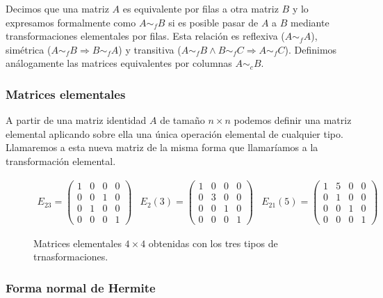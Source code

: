 Decimos que una matriz $A$ es equivalente por filas a otra matriz $B$ y lo expresamos formalmente como $A \sim_f B$ si es posible pasar de $A$ a $B$ mediante transformaciones elementales por filas.
Esta relación es reflexiva ($A \sim_f A$), simétrica ($A \sim_f B \Rightarrow B \sim_f A$) y transitiva ($A \sim_f B \land B \sim_f C \Rightarrow A \sim_f C$).
Definimos análogamente las matrices equivalentes por columnas $A \sim_c B$.

\subsubsection{Matrices elementales}

A partir de una matriz identidad $A$ de tamaño $n \times n$ podemos definir una matriz elemental aplicando sobre ella una única operación elemental de cualquier tipo.
Llamaremos a esta nueva matriz de la misma forma que llamaríamos a la transformación elemental.

\begin{figure}[h!]
\[
	\begin{array}{ccc}
	E_{23} =
	\begin{pmatrix}
		1 & 0 & 0 & 0 \\
		0 & 0 & 1 & 0 \\
		0 & 1 & 0 & 0 \\
		0 & 0 & 0 & 1
	\end{pmatrix}

	&

	E_{2}(3) =
	\begin{pmatrix}
		1 & 0 & 0 & 0 \\
		0 & 3 & 0 & 0 \\
		0 & 0 & 1 & 0 \\
		0 & 0 & 0 & 1
	\end{pmatrix}

	&

	E_{21}(5) =
	\begin{pmatrix}
		1 & 5 & 0 & 0 \\
		0 & 1 & 0 & 0 \\
		0 & 0 & 1 & 0 \\
		0 & 0 & 0 & 1
	\end{pmatrix}

	\end{array}
\]
\caption{Matrices elementales $4 \times 4$ obtenidas con los tres tipos de trnasformaciones.}
\end{figure}

\subsubsection{Forma normal de Hermite}

